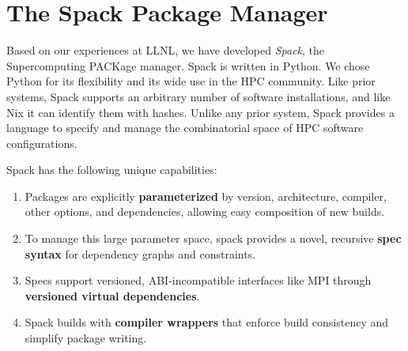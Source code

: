 
\section{The Spack Package Manager}
\label{sec:implementation}
Based on our experiences at LLNL, we have developed
{\it Spack}, the Supercomputing PACKage manager.
Spack is written in Python.  We chose Python for its flexibility
and its wide use in the HPC community.
%
Like prior systems, Spack supports an arbitrary number of software
installations, and like Nix it can identify them with hashes.  Unlike any
prior system, Spack provides a language to specify and manage the
combinatorial space of HPC software configurations.

\noindent
Spack has the following unique capabilities:
\begin{enumerate}
\item Packages are explicitly {\bf parameterized} by version,
      architecture, compiler, other options, and dependencies,
      allowing easy composition of new builds.
\item To manage this large parameter space, spack provides a novel,
      recursive {\bf spec syntax} for dependency graphs and constraints.
\item Specs support versioned, ABI-incompatible interfaces like MPI through
      {\bf versioned virtual dependencies}.
\item Spack builds with {\bf compiler wrappers} that enforce build
      consistency and simplify package writing.
\end{enumerate}






